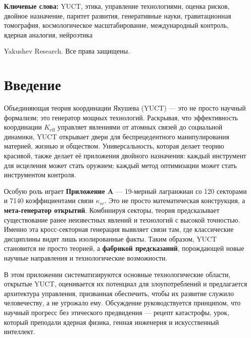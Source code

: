 \documentclass[12pt,a4paper]{article}
\theoremstyle{remark}
\newcommand{\Keff}{K_{\mathrm{eff}}}
\begin{document}
\begin{titlepage}
\begin{center}
			\vspace{1cm}
			
			\noindent
			\small\textbf{Ключевые слова:} YUCT, этика, управление технологиями, оценка рисков, двойное назначение, паритет развития, генеративные науки, гравитационная томография, космологическое масштабирование, международный контроль, ядерная аналогия, нейроэтика
			
			\vspace{0.5cm}
			
			\noindent
			 Yakushev Research. Все права защищены.
		\end{center}
	\end{titlepage}
	
	\tableofcontents
	\newpage
	
	\section{Введение}
	\label{sec:intro}
	
	Объединяющая теория координации Якушева (YUCT) — это не просто научный формализм; это генератор мощных технологий. Раскрывая, что эффективность координации \(\Keff\) управляет явлениями от атомных связей до социальной динамики, YUCT открывает двери для беспрецедентного манипулирования материей, жизнью и обществом. Универсальность, которая делает теорию красивой, также делает её приложения двойного назначения: каждый инструмент для исцеления может стать оружием; каждый метод оптимизации может стать инструментом контроля.
	
	Особую роль играет \textbf{Приложение A} — 19-мерный лагранжиан со 120 секторами и 7140 коэффициентами связи \(\kappa_{sr}\). Это не просто математическая конструкция, а \textbf{мета-генератор открытий}. Комбинируя секторы, теория предсказывает существование ранее неизвестных явлений и технологий с высокой точностью. Именно эта кросс-секторная генерация выявляет связи там, где классические дисциплины видят лишь изолированные факты. Таким образом, YUCT становится не просто теорией, а \textbf{фабрикой предсказаний}, порождающей новые научные направления и технологические возможности.
	
	В этом приложении систематизируются основные технологические области, открытые YUCT, оценивается их потенциал для злоупотреблений и предлагается архитектура управления, призванная обеспечить, чтобы их развитие служило человечеству, а не угрожало ему. Обсуждение руководствуется принципом, что научный прогресс без этического предвидения — рецепт катастрофы, урок, который преподали ядерная физика, генная инженерия и искусственный интеллект.
	
\end{document}
